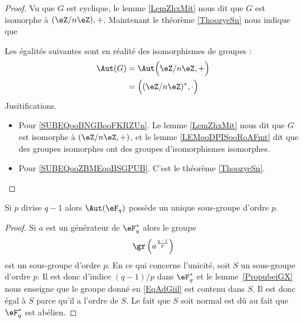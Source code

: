 \begin{proof}
	Vu que \( G\) est cyclique, le lemme \ref{LemZhxMit} nous dit que \( G\) est isomorphe à \( (\eZ/n\eZ),+\). Maintenant le théorème \ref{ThoozyeSn} nous indique que

	Les égalités suivantes sont en réalité des isomorphismes de groupes :
	\begin{subequations}
		\begin{align}
			\Aut(G) & =\Aut\Big( \eZ/n\eZ,+ \Big)  \label{SUBEQooBNGBooFKRZUn}       \\
			        & =\Big( (\eZ/n\eZ)^*,\cdot \Big)    \label{SUBEQooZBMEooBSGPUB}
		\end{align}
	\end{subequations}
	Jusitifications.
	\begin{itemize}
		\item
		      Pour \eqref{SUBEQooBNGBooFKRZUn}. Le lemme \ref{LemZhxMit} nous dit que \( G\) est isomorphe à \( (\eZ/n\eZ, +)\), et le lemme \ref{LEMooDPISooRoAFmt} dit que des groupes isomorphes ont des groupes d'isomorphismes isomorphes.

		\item
		      Pour \eqref{SUBEQooZBMEooBSGPUB}. C'est le théorème \ref{ThoozyeSn}.
	\end{itemize}
\end{proof}

\begin{corollary}       \label{CorwgmoTK}
	Si \( p\) divise \( q-1\) alors \( \Aut(\eF_q)\) possède un unique sous-groupe d'ordre \( p\).
\end{corollary}

\begin{proof}
	Si \( a\) est un générateur de \( \eF_q^*\) alors le groupe
	\begin{equation}    \label{EqAdGiil}
		\gr\left( a^{\frac{ q-1 }{ p }} \right)
	\end{equation}
	est un sous-groupe d'ordre \( p\). En ce qui concerne l'unicité, soit \( S\) un sous-groupe d'ordre \( p\). Il est donc d'indice \( (q-1)/p\) dans \( \eF_q^*\) et le lemme~\ref{PropubeiGX} nous enseigne que le groupe donné en \eqref{EqAdGiil} est contenu dans \( S\). Il est donc égal à \( S\) parce qu'il a l'ordre de \( S\). Le fait que \( S\) soit normal est dû au fait que \( \eF_q^*\) est abélien.
\end{proof}




